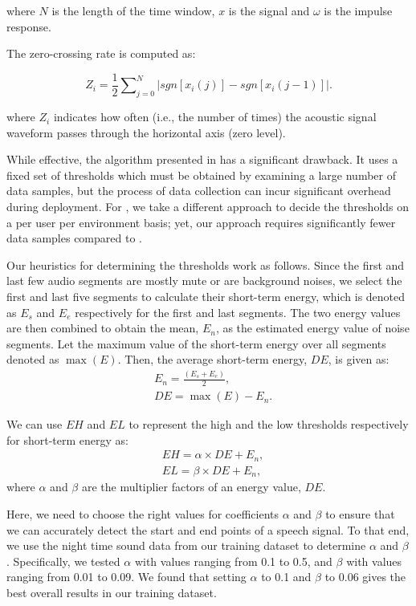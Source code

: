 where $N$ is the length of the time window, $x$ is the signal and $\omega$ is the impulse response.

The zero-crossing rate is computed as:

\begin{equation}
  Z_i = \frac{1}{2}\sum\nolimits_{j=0}^{N}|sgn[x_i(j)]-sgn[x_i(j-1)]|.
  \label{eq:zeroc}
\end{equation}


where $Z_i$ indicates how often (i.e., the number of times) the acoustic signal waveform passes through the horizontal axis (zero level).


While effective, the algorithm presented in \cite{endpoint2008} has a significant drawback. It uses a fixed set of thresholds which must be
obtained  by examining a large number of data samples, but the process of data collection can incur significant overhead during deployment.
For \systemname, we take a different approach to decide the thresholds on a per user per environment basis; yet, our approach requires
significantly fewer data samples compared to \cite{endpoint2008}.


Our heuristics for determining the thresholds work as follows.  Since the first and last few audio segments are mostly mute or are
background noises, we select the first and last five segments to calculate their short-term energy, which is denoted as $E_s$ and $E_e$
respectively for the first and last segments. The two energy values are then combined to obtain the mean, $E_n$, as the estimated energy
value of noise segments. Let the maximum value of the short-term energy over all segments denoted as $\max (E)$. Then, the average
short-term energy, $DE$, is given as:
\begin{eqnarray}
      &E_n = \frac{(E_s+E_e)}{2}, \\
      &DE = \max (E)-E_n.\label{eq:DE}
\end{eqnarray}

We can use $EH$ and $EL$ to represent the high and the low thresholds respectively for short-term energy as:
\begin{eqnarray}
      &EH=\alpha \times DE+E_n,\\
      &EL=\beta \times DE+E_n,
\end{eqnarray}
where $\alpha$ and $\beta$ are the multiplier factors of an energy value, $DE$.


Here, we need to choose the right values for coefficients $\alpha$ and $\beta$ to ensure that we can accurately detect the start and end
points of a speech signal. To that end, we use the night time sound data from our training dataset to determine $\alpha$ and $\beta$.
Specifically, we tested $\alpha$ with values ranging from 0.1 to 0.5, and $\beta$ with values ranging from 0.01 to 0.09. We found that
setting $\alpha$ to  0.1 and $\beta$ to  0.06 gives the best overall results in our training dataset.

